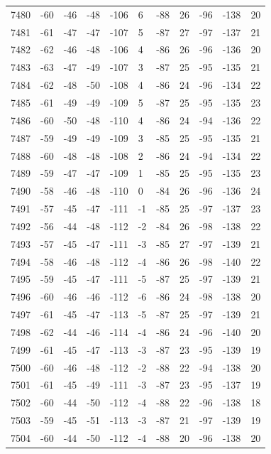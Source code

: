 \begin{table}[H]
\begin{tabular}{lllllllllll}
7480 & -60 & -46 & -48 & -106 & 6 & -88 & 26 & -96 & -138 & 20 \\
7481 & -61 & -47 & -47 & -107 & 5 & -87 & 27 & -97 & -137 & 21 \\
7482 & -62 & -46 & -48 & -106 & 4 & -86 & 26 & -96 & -136 & 20 \\
7483 & -63 & -47 & -49 & -107 & 3 & -87 & 25 & -95 & -135 & 21 \\
7484 & -62 & -48 & -50 & -108 & 4 & -86 & 24 & -96 & -134 & 22 \\
7485 & -61 & -49 & -49 & -109 & 5 & -87 & 25 & -95 & -135 & 23 \\
7486 & -60 & -50 & -48 & -110 & 4 & -86 & 24 & -94 & -136 & 22 \\
7487 & -59 & -49 & -49 & -109 & 3 & -85 & 25 & -95 & -135 & 21 \\
7488 & -60 & -48 & -48 & -108 & 2 & -86 & 24 & -94 & -134 & 22 \\
7489 & -59 & -47 & -47 & -109 & 1 & -85 & 25 & -95 & -135 & 23 \\
7490 & -58 & -46 & -48 & -110 & 0 & -84 & 26 & -96 & -136 & 24 \\
7491 & -57 & -45 & -47 & -111 & -1 & -85 & 25 & -97 & -137 & 23 \\
7492 & -56 & -44 & -48 & -112 & -2 & -84 & 26 & -98 & -138 & 22 \\
7493 & -57 & -45 & -47 & -111 & -3 & -85 & 27 & -97 & -139 & 21 \\
7494 & -58 & -46 & -48 & -112 & -4 & -86 & 26 & -98 & -140 & 22 \\
7495 & -59 & -45 & -47 & -111 & -5 & -87 & 25 & -97 & -139 & 21 \\
7496 & -60 & -46 & -46 & -112 & -6 & -86 & 24 & -98 & -138 & 20 \\
7497 & -61 & -45 & -47 & -113 & -5 & -87 & 25 & -97 & -139 & 21 \\
7498 & -62 & -44 & -46 & -114 & -4 & -86 & 24 & -96 & -140 & 20 \\
7499 & -61 & -45 & -47 & -113 & -3 & -87 & 23 & -95 & -139 & 19 \\
7500 & -60 & -46 & -48 & -112 & -2 & -88 & 22 & -94 & -138 & 20 \\
7501 & -61 & -45 & -49 & -111 & -3 & -87 & 23 & -95 & -137 & 19 \\
7502 & -60 & -44 & -50 & -112 & -4 & -88 & 22 & -96 & -138 & 18 \\
7503 & -59 & -45 & -51 & -113 & -3 & -87 & 21 & -97 & -139 & 19 \\
7504 & -60 & -44 & -50 & -112 & -4 & -88 & 20 & -96 & -138 & 20 \\

\end{tabular}
\end{table}
